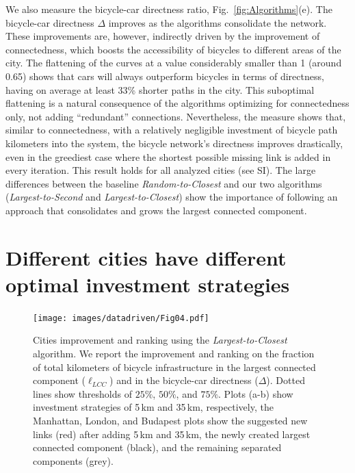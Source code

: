 We also measure the bicycle-car directness ratio, Fig.~\ref{fig:Algorithms}(e). The bicycle-car directness $\Delta$ improves as the algorithms consolidate the network. These improvements are, however, indirectly driven by the improvement of connectedness, which boosts the accessibility of bicycles to different areas of the city. The flattening of the curves at a value considerably smaller than 1 (around 0.65) shows that cars will always outperform bicycles in terms of directness, having on average at least 33\% shorter paths in the city. This suboptimal flattening is a natural consequence of the algorithms optimizing for connectedness only, not adding ``redundant'' connections. Nevertheless, the measure shows that, similar to connectedness, with a relatively negligible investment of bicycle path kilometers into the system, the bicycle network's directness improves drastically, even in the greediest case where the shortest possible missing link is added in every iteration. This result holds for all analyzed cities (see SI). The large differences between the baseline \emph{Random-to-Closest} and our two algorithms (\emph{Largest-to-Second} and \emph{Largest-to-Closest}) show the importance of following an approach that consolidates and grows the largest connected component.

\section{Different cities have different optimal investment strategies}

\begin{figure}[htbp]
  \centering
  \texttt{[image: images/datadriven/Fig04.pdf]}
  \caption[Cities bicycle connectivity improvement]{Cities improvement and ranking using the \emph{Largest-to-Closest} algorithm. We report the improvement and ranking on the fraction of total kilometers of bicycle infrastructure in the largest connected component ($\ell_{LCC}$) and in the bicycle-car directness ($\Delta$). Dotted lines show thresholds of $25\%$, $50\%$, and $75\%$. Plots (a-b) show investment strategies of 5\,km and 35\,km, respectively, the Manhattan, London, and Budapest plots show the suggested new links (red) after adding 5\,km and 35\,km, the newly created largest connected component (black), and the remaining separated components (grey).}
  \label{fig:Improvement}
\end{figure}

